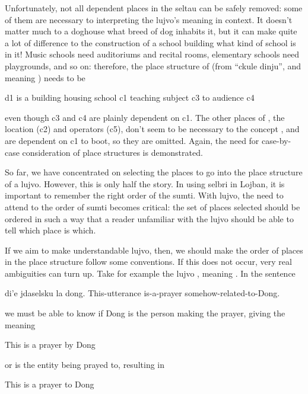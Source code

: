 Unfortunately, not all dependent places in the seltau can be
    safely removed: some of them are necessary to interpreting the
    lujvo's meaning in context. It doesn't matter much to a
    doghouse what breed of dog inhabits it, but it can make quite a
    lot of difference to the construction of a school building what
    kind of school is in it! Music schools need auditoriums and
    recital rooms, elementary schools need playgrounds, and so on:
    therefore, the place structure of  (from ``ckule
    dinju'', and meaning ) needs to be
\begin{example}
d1 is a building housing school c1\n
\T	teaching subject c3 to audience c4
\end{example}

{\noindent}even though c3 and c4 are plainly dependent on c1. The other
    places of , the location (c2) and operators (c5),
    don't seem to be necessary to the concept ,
    and are dependent on c1 to boot, so they are omitted. Again,
    the need for case-by-case consideration of place structures is
    demonstrated.



So far, we have concentrated on selecting the places to go
    into the place structure of a lujvo. However, this is only half
    the story. In using selbri in Lojban, it is important to
    remember the right order of the sumti. With lujvo, the need to
    attend to the order of sumti becomes critical: the set of
    places selected should be ordered in such a way that a reader
    unfamiliar with the lujvo should be able to tell which place is
    which.

If we aim to make understandable lujvo, then, we should make
    the order of places in the place structure follow some
    conventions. If this does not occur, very real ambiguities can
    turn up. Take for example the lujvo , meaning
    . In the sentence
\begin{example}
di'e jdaselsku la dong.\n
This-utterance is-a-prayer somehow-related-to-Dong.
\end{example}

{\noindent}we must be able to know if Dong is the person making the
    prayer, giving the meaning
\begin{example}
This is a prayer by Dong
\end{example}

{\noindent}or is the entity being prayed to, resulting in
\begin{example}
This is a prayer to Dong
\end{example}

